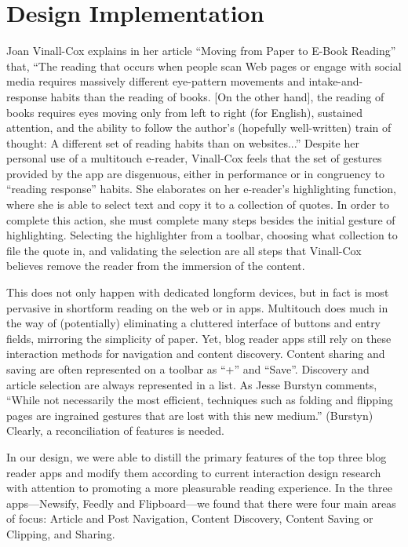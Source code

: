 \documentclass[11pt, oneside]{article}   	%
\begin{document}
\section{Design Implementation}
Joan Vinall-Cox explains in her article ``Moving from Paper to E-Book Reading'' that, ``The reading that occurs when people scan Web pages or engage with social media requires massively different eye-pattern movements and intake-and-response habits than the reading of books. [On the other hand], the reading of books requires eyes moving only from left to right (for English), sustained attention, and the ability to follow the author's (hopefully well-written) train of thought: A different set of reading habits than on websites...'' \cite{vinall-cox} Despite her personal use of a multitouch e-reader, Vinall-Cox feels that the set of gestures provided by the app are disgenuous, either in performance or in congruency to ``reading response'' habits. She elaborates on her e-reader's highlighting function, where she is able to select text and copy it to a collection of quotes. In order to complete this action, she must complete many steps besides the initial gesture of highlighting. Selecting the highlighter from a toolbar, choosing what collection to file the quote in, and validating the selection are all steps that Vinall-Cox believes remove the reader from the immersion of the content.

This does not only happen with dedicated longform devices, but in fact is most pervasive in shortform reading on the web or in apps. Multitouch does much in the way of (potentially) eliminating a cluttered interface of buttons and entry fields, mirroring the simplicity of paper. Yet, blog reader apps still rely on these interaction methods for navigation and content discovery. Content sharing and saving are often represented on a toolbar as ``+'' and ``Save''. Discovery and article selection are always represented in a list. As Jesse Burstyn comments, ``While not necessarily the most efficient, techniques such as folding and flipping pages are ingrained gestures that are lost with this new medium.'' (Burstyn) Clearly, a reconciliation of features is needed.

In our design, we were able to distill the primary features of the top three blog reader apps and modify them according to current interaction design research with attention to promoting a more pleasurable reading experience. In the three apps---Newsify, Feedly and Flipboard---we found that there were four main areas of focus: Article and Post Navigation, Content Discovery, Content Saving or Clipping, and Sharing. 
\end{document}
